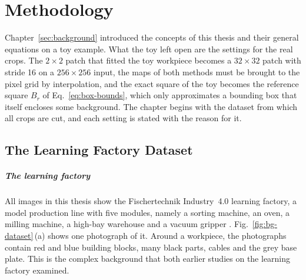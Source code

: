 \chapter{Methodology}
\label{sec:methodology}

Chapter~\ref{sec:background} introduced the concepts of this thesis and their general
equations on a toy example. What the toy left open are the settings for the real
crops. The $2 \times 2$ patch that fitted the toy workpiece becomes a
$32 \times 32$ patch with stride 16 on a $256 \times 256$ input, the maps of both methods
must be brought to the pixel grid by interpolation, and the exact square of the toy
becomes the reference square $B_r$ of Eq.~\eqref{eq:box-bounds}, which only approximates
a bounding box that itself encloses some background. The chapter begins with the
dataset from which all crops are cut, and each setting is stated with the reason for it.

\section{The Learning Factory Dataset}
\label{sec:methodology-dataset}

\paragraph{The learning factory}
All images in this thesis show the Fischertechnik Industry~4.0 learning factory, a
model production line with five modules, namely a sorting machine, an oven, a milling
machine, a high-bay warehouse and a vacuum gripper \citep{schneidereitFischertechnik2023,
schneidereitYOLOv8}. Fig.~\ref{fig:bg-dataset}\,(a) shows one photograph of it. Around a
workpiece, the photographs contain red and blue building blocks, many black parts,
cables and the grey base plate. This is the complex background that both earlier
studies on the learning factory examined.

